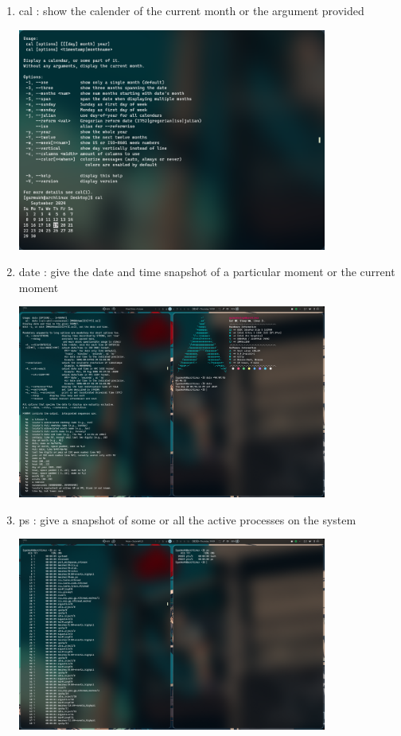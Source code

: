 \documentclass[12pt,letterpaper]{article}
\begin{document}
\begin{enumerate}
\begin{enumerate}
\begin{center}
        \end{center}
      \item cal : show the calender of the current month or the argument provided
        \begin{center}
          \includegraphics[width=0.8\textwidth]{screens/Pasted image (11).png}
        \end{center}
      \item date : give the date and time snapshot of a particular moment or the current moment
        \begin{center}
          \includegraphics[width=0.8\textwidth]{screens/Pasted image (12).png}
        \end{center}
      \item ps : give a snapshot of some or all the active processes on the system
        \begin{center}
          \includegraphics[width=0.8\textwidth]{screens/Pasted image (13).png}

\end{center}
\end{enumerate}
\end{enumerate}
\end{document}
